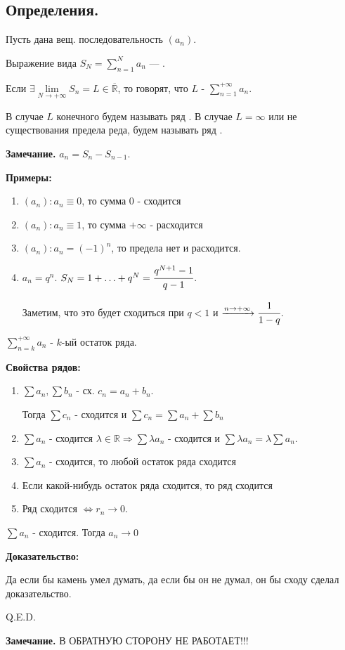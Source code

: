 \subsection{Определения.}

 Пусть дана вещ. последовательность $(a_n)$. 

Выражение вида $S_N  = \sum\limits_{n=1}^N a_n$ --- .

Если $\exists \lim\limits_{N \rightarrow +\infty}S_n = L \in \overline{\mathbb{R}}$, то говорят, что $L$ -  $\sum\limits_{n=1}^{+\infty}a_n$.

В случае $L$ конечного будем называть ряд . В случае $L = \infty$ или не существования предела реда, будем называть ряд .  

\textbf{Замечание.}  $a_n = S_n - S_{n-1}$.

\textbf{Примеры:}
\begin{enumerate}
    \item $(a_n): a_n \equiv 0$, то сумма $0$ - сходится
    \item $(a_n): a_n \equiv 1$, то сумма $+\infty$ - расходится
    \item $(a_n): a_n = (-1)^n$, то предела нет и расходится.
    \item $a_n = q^n$. $S_N = 1+\ldots + q^N =\cfrac{q^{N+1}-1}{q-1}$.
    
    Заметим, что это будет сходиться при $q<1$ и $\xrightarrow{n \rightarrow +\infty} \cfrac{1}{1-q}$. 
\end{enumerate}

$\sum\limits_{n=k}^{+\infty} a_n$ - $k$-ый остаток ряда.

\textbf{Свойства рядов:}

\begin{enumerate}
    \item $\sum a_n , \sum b_n$ - сх. $c_n = a_n + b_n$.

        Тогда $\sum c_n$ - сходится и $\sum c_n = \sum a_n + \sum b_n$
    \item $\sum a_n$  - сходится $\lambda\in \mathbb{R} \Rightarrow \sum\lambda a_n$ - сходится и $\sum \lambda a_n = \lambda \sum a_n$.
    \item $\sum a_n$ - сходится, то любой остаток ряда сходится
    \item Если какой-нибудь остаток ряда сходится, то ряд сходится
    \item Ряд сходится $\Leftrightarrow r_n \rightarrow 0 $.
\end{enumerate}


$\sum a_n$ - сходится. Тогда $a_n \rightarrow 0$

\textbf{Доказательство:}

Да если бы камень умел думать, да если бы он не думал, он бы сходу сделал доказательство.

\hfill Q.E.D.

\textbf{Замечание.} В ОБРАТНУЮ СТОРОНУ НЕ РАБОТАЕТ!!!





